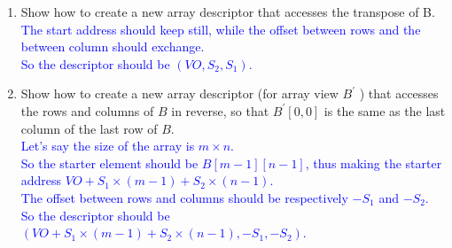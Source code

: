 \documentclass[10pt]{article}
\begin{document}
\begin{enumerate}
\begin{enumerate}
              \item Show how to create a new array descriptor that accesses the transpose of B.
                    \textcolor{blue}{\\
                        The start address should keep still, while the offset between rows and the between column should exchange.\\
                        So the descriptor should be $(VO,S_2,S_1)$.
                    }
              \item Show how to create a new array descriptor (for array view $B^{\prime}$ ) that accesses the rows and
                    columns of $B$ in reverse, so that $B^{\prime}[0,0]$ is the same as the last column of the last row of $B$.
                    \textcolor{blue}{\\
                        Let's say the size of the array is $m\times n$.\\
                        So the starter element should be $B[m-1][n-1]$, thus making the starter address $VO+S_1\times (m-1)+S_2\times (n-1)$.\\
                        The offset between rows and columns should be respectively $-S_1$ and $-S_2$.\\
                        So the descriptor should be $(VO+S_1\times (m-1)+S_2\times (n-1),-S_1,-S_2)$.
                    }
          \end{enumerate}
\end{enumerate}
\end{document}
